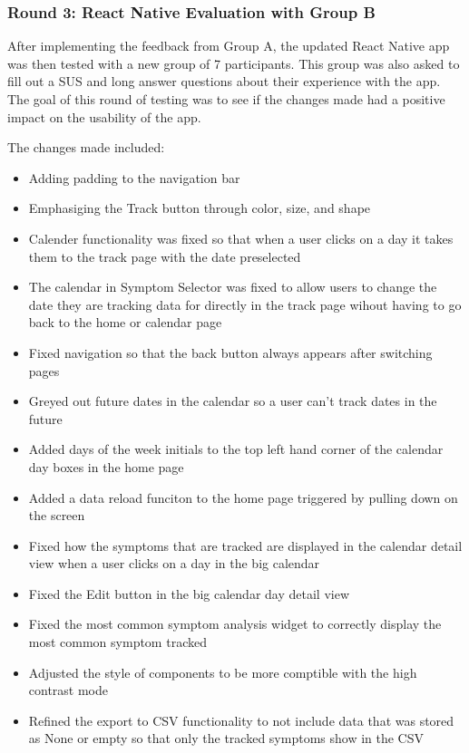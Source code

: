 \subsubsection{Round 3: React Native Evaluation with Group B}
After implementing the feedback from Group A, the updated React Native app was then tested with a new group of 7 participants. This group was also asked to fill out a SUS and long answer questions about their experience with the app. The goal of this round of testing was to see if the changes made had a positive impact on the usability of the app.

The changes made included: 
\begin{itemize}
    \item Adding padding to the navigation bar
    \item Emphasiging the Track button through color, size, and shape
    \item Calender functionality was fixed so that when a user clicks on a day it takes them to the track page with the date preselected
    \item The calendar in Symptom Selector was fixed to allow users to change the date they are tracking data for directly in the track page wihout having to go back to the home or calendar page
    \item Fixed navigation so that the back button always appears after switching pages
    \item Greyed out future dates in the calendar so a user can't track dates in the future
    \item Added days of the week initials to the top left hand corner of the calendar day boxes in the home page
    \item Added a data reload funciton to the home page triggered by pulling down on the screen 
    \item Fixed how the symptoms that are tracked are displayed in the calendar detail view when a user clicks on a day in the big calendar
    \item Fixed the Edit button in the big calendar day detail view 
    \item Fixed the most common symptom analysis widget to correctly display the most common symptom tracked
    \item Adjusted the style of components to be more comptible with the high contrast mode 
    \item Refined the export to CSV functionality to not include data that was stored as None or empty so that only the tracked symptoms show in the CSV
\end{itemize}


